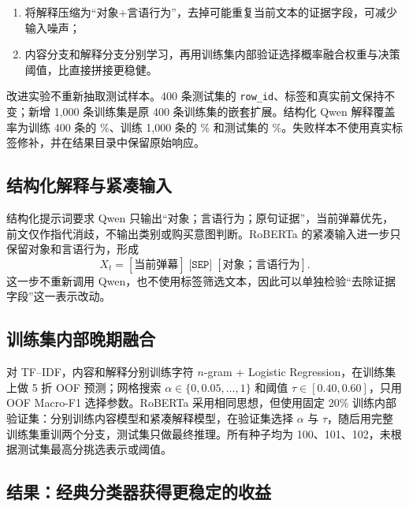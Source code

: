 \documentclass[UTF8,zihao=-4,a4paper]{ctexart}
\begin{document}
\begin{enumerate}[leftmargin=2em]
  \item 将解释压缩为“对象+言语行为”，去掉可能重复当前文本的证据字段，可减少输入噪声；
  \item 内容分支和解释分支分别学习，再用训练集内部验证选择概率融合权重与决策阈值，比直接拼接更稳健。
\end{enumerate}

改进实验不重新抽取测试样本。400 条测试集的 \texttt{row\_id}、标签和真实前文保持不变；新增 1,000 条训练集是原 400 条训练集的嵌套扩展。结构化 Qwen 解释覆盖率为训练 400 条的 \ImproveQwenTrainSmallCoverage\%、训练 1,000 条的 \ImproveQwenTrainLargeCoverage\% 和测试集的 \ImproveQwenTestSmallCoverage\%。失败样本不使用真实标签修补，并在结果目录中保留原始响应。

\subsection{结构化解释与紧凑输入}

结构化提示词要求 Qwen 只输出“对象；言语行为；原句证据”，当前弹幕优先，前文仅作指代消歧，不输出类别或购买意图判断。RoBERTa 的紧凑输入进一步只保留对象和言语行为，形成
\begin{equation}
  X_t = [\text{当前弹幕}]\;\texttt{[SEP]}\;[\text{对象；言语行为}].
\end{equation}
这一步不重新调用 Qwen，也不使用标签筛选文本，因此可以单独检验“去除证据字段”这一表示改动。

\subsection{训练集内部晚期融合}

对 TF--IDF，内容和解释分别训练字符 $n$-gram + Logistic Regression，在训练集上做 5 折 OOF 预测；网格搜索 $\alpha\in\{0,0.05,\ldots,1\}$ 和阈值 $\tau\in[0.40,0.60]$，只用 OOF Macro-F1 选择参数。RoBERTa 采用相同思想，但使用固定 20\% 训练内部验证集：分别训练内容模型和紧凑解释模型，在验证集选择 $\alpha$ 与 $\tau$，随后用完整训练集重训两个分支，测试集只做最终推理。所有种子均为 100、101、102，未根据测试集最高分挑选表示或阈值。

\begin{table}[htbp]
\centering
\caption{改进前后 TF--IDF 结果。晚期融合的参数只由训练集 OOF 选择。}
\label{tab:improvement-classical}
\resizebox{\textwidth}{!}{}
\end{table}

\subsection{结果：经典分类器获得更稳定的收益}
\end{document}
